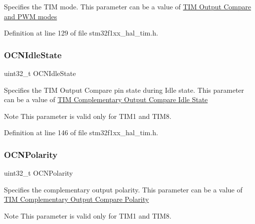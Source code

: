 Specifies the T\+IM mode. This parameter can be a value of \hyperlink{group___t_i_m___output___compare__and___p_w_m__modes}{T\+IM Output Compare and P\+WM modes} 

Definition at line 129 of file stm32f1xx\+\_\+hal\+\_\+tim.\+h.

\mbox{\label{struct_t_i_m___one_pulse___init_type_def_a78d21970d78c1e3e328692743406ba25}} 
\subsubsection{\texorpdfstring{O\+C\+N\+Idle\+State}{OCNIdleState}}
{\footnotesize\ttfamily uint32\+\_\+t O\+C\+N\+Idle\+State}

Specifies the T\+IM Output Compare pin state during Idle state. This parameter can be a value of \hyperlink{group___t_i_m___output___compare___n___idle___state}{T\+IM Complementary Output Compare Idle State} \begin{DoxyNote}{Note}
This parameter is valid only for T\+I\+M1 and T\+I\+M8. 
\end{DoxyNote}


Definition at line 146 of file stm32f1xx\+\_\+hal\+\_\+tim.\+h.

\mbox{\label{struct_t_i_m___one_pulse___init_type_def_a978da9dd7cda80eb5fe8d04828b9bbcc}} 
\subsubsection{\texorpdfstring{O\+C\+N\+Polarity}{OCNPolarity}}
{\footnotesize\ttfamily uint32\+\_\+t O\+C\+N\+Polarity}

Specifies the complementary output polarity. This parameter can be a value of \hyperlink{group___t_i_m___output___compare___n___polarity}{T\+IM Complementary Output Compare Polarity} \begin{DoxyNote}{Note}
This parameter is valid only for T\+I\+M1 and T\+I\+M8. 
\end{DoxyNote}


